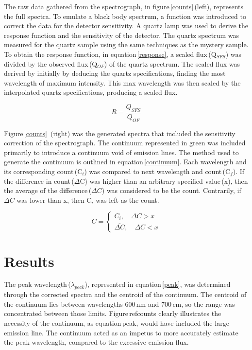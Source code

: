 \documentclass[twocolumn]{aastex6}
\begin{document}
The raw data gathered from the spectrograph, in figure\,\ref{counts}\,(left), represents the full spectra. To emulate a black body spectrum, a function was introduced to correct the data for the detector sensitivity. A quartz lamp was used to derive the response function and the sensitivity of the detector. The quartz spectrum was measured for the quartz sample using the same techniques as the mystery sample. To obtain the response function, in equation\,\ref{response}, a scaled flux\,(Q$_{SFS}$) was divided by the observed flux\,(Q$_{OF}$) of the quartz spectrum. The scaled flux was derived by initially by deducing the quartz specifications, finding the most wavelength of maximum intensity. This max wavelength was then scaled by the interpolated quartz specifications, producing a scaled flux.

\begin{equation}
R = \frac{Q_{SFS}}{Q_{OF}}
\label{response}
\end{equation}

Figure\,\ref{counts} \,(right) was the generated spectra that included the sensitivity correction of the spectrograph. The continuum represented in green was included primarily to introduce a continuum void of emission lines. The method used to generate the continuum is outlined in equation\,\ref{continuum}. Each wavelength and its corresponding count\,(C$_i$) was compared to next wavelength and count\,(C$_f$). If the difference in count\,($\Delta$C) was higher than an arbitrary specified value\,(x), then the average of the difference\,($\overline{\Delta C}$) was considered to be the count. Contrarily, if $\Delta C$ was lower than x, then C$_i$ was left as the count.


\begin{equation}
C = 
\begin{cases}
C_i ,\quad \Delta C > x \\
\overline{\Delta C},\quad  \Delta C < x 
\end{cases}
\label{continuum}
\end{equation}



\section{Results}

The peak wavelength\,($\lambda_{peak}$), represented in equation\,\ref{peak}, was determined through the corrected spectra and the centroid of the continuum. The centroid of the continuum lies between wavelengths 600\,nm and 700\,cm, so the range was concentrated between those limits. Figure\,ref{counts} clearly illustrates the necessity of the continuum, as equation\,{peak}, would have included the large emission line. The continuum acted as an impetus to more accurately estimate the peak wavelength, compared to the excessive emission flux.
\end{document}
